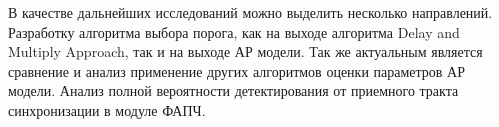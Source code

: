 В качестве дальнейших исследований можно выделить несколько направлений. Разработку алгоритма выбора порога, как на выходе алгоритма Delay and Multiply Approach,
так и на выходе АР модели. Так же актуальным является сравнение и анализ применение других алгоритмов оценки параметров АР модели. Анализ полной вероятности
детектирования от приемного тракта синхронизации в модуле ФАПЧ.

\newpage
